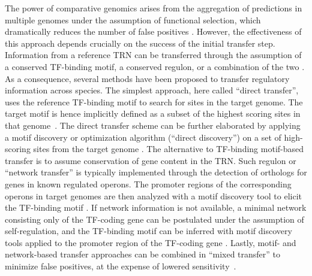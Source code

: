 The power of comparative genomics arises from the aggregation of predictions in
multiple genomes under the assumption of functional selection, which
dramatically reduces the number of false positives
\citep{gelfand2000comparative}. However, the effectiveness of this approach
depends crucially on the success of the initial transfer step. Information from
a reference TRN can be transferred through the assumption of a conserved
TF-binding motif, a conserved regulon, or a combination of the two
\citep{babu2008computational, baumbach2010power}. As a consequence, several
methods have been proposed to transfer regulatory information across
species. The simplest approach, here called “direct transfer”, uses the
reference TF-binding motif to search for sites in the target genome. The target
motif is hence implicitly defined as a subset of the highest scoring sites in
that genome~\citep{tan2001comparative, makarova2001conservation,
  erill2004differences, rodionov2013transcriptional}.
The direct transfer scheme can be further elaborated by applying a motif discovery
or optimization algorithm (``direct discovery'')
on a set of high-scoring sites from the target genome
\citep{baumbach2009reliable, habib2012functional}. The alternative to TF-binding
motif-based transfer is to assume conservation of gene content in the
TRN\@. Such regulon or “network transfer” is typically implemented through the
detection of orthologs for genes in known regulated operons. The promoter
regions of the corresponding operons in target genomes are then analyzed with a
motif discovery tool to elicit the TF-binding motif
\citep{mccue2001phylogenetic, wang2003combining, panina2003comparative,
  zhang2009genome}. If network information is not available, a minimal network
consisting only of the TF-coding gene can be postulated under the assumption of
self-regulation, and the TF-binding motif can be inferred with motif discovery
tools applied to the promoter region of the TF-coding gene
\citep{francke2008generic, cornish2012inference,
  ravcheev2014comparative}. Lastly, motif- and network-based transfer
approaches can be combined in “mixed transfer” to minimize false positives, at
the expense of lowered sensitivity~\citep{baumbach2010power,
  baumbach2009reliable, yu2004annotation}.

